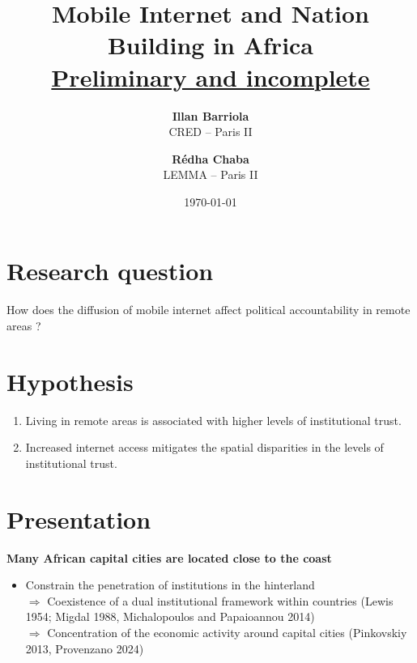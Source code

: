 \documentclass[11pt]{article}
\theoremstyle{plain}
\theoremstyle{plain}
\begin{document}
\title{Mobile Internet and Nation Building in Africa\\  \vspace{0.75cm} \underline{Preliminary and incomplete }}

\vspace{1cm}

\author{
\textbf{Illan Barriola} \\ CRED -- Paris II \\
\and \textbf{R\'{e}dha Chaba}\\ LEMMA -- Paris II \\
}

\date{ \today}

\maketitle

\section*{Research question}

How does the diffusion of mobile internet affect political accountability in remote areas ?
\section*{Hypothesis}
\begin{enumerate}
  \item Living in remote areas is associated with higher levels of institutional trust.
  \item Increased internet access mitigates the spatial disparities in the levels of institutional trust.
\end{enumerate}

\section*{Presentation}
\textbf{Many African capital cities are located close to the coast} 
  \begin{itemize}
    \item Constrain the penetration of institutions in the hinterland\\
    $\Rightarrow$ Coexistence of a dual institutional framework within countries (Lewis 1954; Migdal 1988, Michalopoulos and Papaioannou 2014)\\
    $\Rightarrow$ Concentration of the economic activity around capital cities (Pinkovskiy 2013, Provenzano 2024)
  
  \end{itemize}
\clearpage
\end{document}
